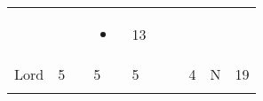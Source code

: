\documentclass[12pt]{article}
\begin{document}
\begin{longtable}[]{@{}llllllllll@{}}
\begin{minipage}[t]{0.06\columnwidth}\raggedright\strut
\strut\end{minipage} &
\begin{minipage}[t]{0.06\columnwidth}\raggedright\strut
\strut\end{minipage} &
\begin{minipage}[t]{0.06\columnwidth}\raggedright\strut
\strut\end{minipage} &
\begin{minipage}[t]{0.07\columnwidth}\raggedright\strut
\begin{itemize}
\item
\end{itemize}
\strut\end{minipage} &
\begin{minipage}[t]{0.08\columnwidth}\raggedright\strut
13
\strut\end{minipage}\tabularnewline
\begin{minipage}[t]{0.13\columnwidth}\raggedright\strut
Lord
\strut\end{minipage} &
\begin{minipage}[t]{0.06\columnwidth}\raggedright\strut
5
\strut\end{minipage} &
\begin{minipage}[t]{0.06\columnwidth}\raggedright\strut
\strut\end{minipage} &
\begin{minipage}[t]{0.06\columnwidth}\raggedright\strut
5
\strut\end{minipage} &
\begin{minipage}[t]{0.06\columnwidth}\raggedright\strut
5
\strut\end{minipage} &
\begin{minipage}[t]{0.06\columnwidth}\raggedright\strut
\strut\end{minipage} &
\begin{minipage}[t]{0.06\columnwidth}\raggedright\strut
\strut\end{minipage} &
\begin{minipage}[t]{0.06\columnwidth}\raggedright\strut
4
\strut\end{minipage} &
\begin{minipage}[t]{0.07\columnwidth}\raggedright\strut
N
\strut\end{minipage} &
\begin{minipage}[t]{0.08\columnwidth}\raggedright\strut
19
\strut\end{minipage}\tabularnewline
\begin{minipage}[t]{0.13\columnwidth}\raggedright\strut

\end{minipage}
\end{longtable}
\end{document}
